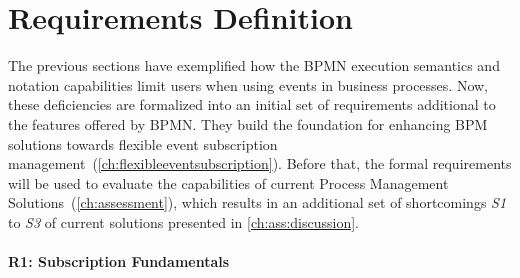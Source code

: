 \section{Requirements Definition}\label{ch:requirements}
The previous sections have exemplified how the BPMN execution semantics and notation capabilities limit users when using events in business processes. 
Now, these deficiencies are formalized into an initial set of requirements additional to the features offered by BPMN.
They build the foundation for enhancing BPM solutions towards flexible event subscription management~(\autoref{ch:flexibleeventsubscription}).
Before that, the formal requirements will be used to evaluate the capabilities of current Process Management Solutions~(\autoref{ch:assessment}), which results in an additional set of shortcomings \textit{S1} to \textit{S3} of current solutions presented in \autoref{ch:ass:discussion}.



\paragraph{R1: Subscription Fundamentals}

